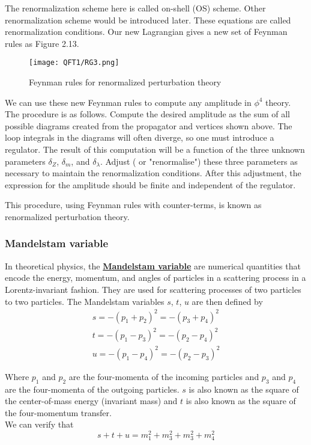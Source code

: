 The renormalization scheme here is called on-shell (OS) scheme. Other renormalization scheme would be introduced later.
These equations are called renormalization conditions.
Our new Lagrangian gives a new set of Feynman rules as Figure 2.13.
\begin{figure}[!h]
\centering
\texttt{[image: QFT1/RG3.png]}
\caption{Feynman rules for renormalized perturbation theory}
\end{figure}

We can use these new Feynman rules to compute any amplitude in $\phi^4$ theory. The procedure is as follows. Compute the desired amplitude as the sum of all possible diagrams created from the propagator and vertices shown above. The loop integrals in the diagrams will often diverge, so one must introduce a regulator. The result of this computation will be a function of the three unknown parameters $\delta_Z$, $\delta_m$, and $\delta_{\lambda}$. Adjust ( or "renormalise") these three parameters as necessary to maintain the renormalization conditions. After this adjustment, the expression for the amplitude should be finite and independent of the regulator.

This procedure, using Feynman rules with counter-terms, is known as renormalized perturbation theory. 

\subsubsection{Mandelstam variable}
In theoretical physics, the \href{https://en.wikipedia.org/wiki/Mandelstam_variables}{\textbf{Mandelstam variable}}  are numerical quantities that encode the energy, momentum, and angles of particles in a scattering process in a Lorentz-invariant fashion. They are used for scattering processes of two particles to two particles. 
The Mandelstam variables $s$, $t$, $u$ are then defined by
\begin{eqnarray}
s=-(p_{1}+p_{2})^{2}=-(p_{3}+p_{4})^{2} \nonumber \\
t=-(p_{1}-p_{3})^{2}=-(p_{2}-p_{4})^{2} \nonumber \\
u=-(p_{1}-p_{4})^{2}=-(p_{2}-p_{3})^{2} \nonumber
\end{eqnarray}

Where $p_1$ and $p_2$ are the four-momenta of the incoming particles and $p_3$ and $p_4$ are the four-momenta of the outgoing particles.
$s$ is also known as the square of the center-of-mass energy (invariant mass) and $t$ is also known as the square of the four-momentum transfer.\\
We can verify that
\[s+t+u = m_1^2 + m_3^2 + m_3^2 +m_4^2\]

